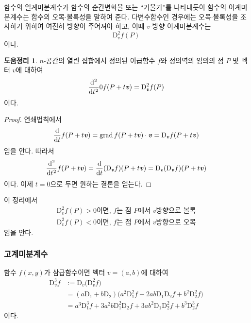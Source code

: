 \documentclass[unfonts,oneside,a4paper]{oblivoir}
\theoremstyle{definition}
\theoremstyle{theorem}
\newtheorem{lemma}{도움정리}[subsubsection]
\renewcommand{\vec}[1]{\bm{\mathit{#1}}}
\newcommand{\dD}{\mathrm{D}}
\DeclareMathOperator{\grad}{grad}
\begin{document}
함수의 일계미분계수가 함수의 순간변화율 또는 ``기울기''를 나타내듯이 함수의 이계미분계수는 함수의 오목$\cdot$볼록성을 말하여 준다.
다변수함수인 경우에는 오목$\cdot$볼록성을 조사하기 위하여 여전히 방향이 주어져야 하고, 이때 $\vec v$-방향 이계미분계수는
\begin{equation*}
    \dD_{\vec v}^2 f(P)
\end{equation*}
이다.

\begin{lemma}
    $n$-공간의 열린 집합에서 정의된 이급함수 $f$와 정의역의 임의의 점 $P$ 및 벡터 $\vec v$에 대하여
    \begin{equation*}
        \diff*[2]{}{t}{0} f(P + t \vec v) = \dD_{\vec v}^2 f(P)
    \end{equation*}
    이다.
\end{lemma}

\begin{proof}
    연쇄법칙에서
    \begin{equation*}
        \diff*{f(P + t \vec v)}{t} = \grad f(P + t \vec v) \cdot \vec v = \dD_{\vec v} f(P + t \vec v)
    \end{equation*}
    임을 안다.
    따라서
    \begin{equation*}
        \diff*[2]{f(P+ t \vec v)}{t} = \diff*{(\dD_{\vec v}f)}{t} (P + t \vec v) = \dD_{\vec v} (\dD_{\vec v}f)(P + t \vec v)
    \end{equation*}
    이다.
    이제 $t = 0$으로 두면 원하는 결론을 얻는다.
\end{proof}

이 정리에서
\begin{align*}
    \dD_{\vec v}^2 f(P) > 0 \text{이면, $f$는 점 $P$에서 $\vec v$방향으로 볼록}\\
    \dD_{\vec v}^2 f(P) < 0 \text{이면, $f$는 점 $P$에서 $\vec v$방향으로 오목}
\end{align*}
임을 안다.

\subsubsection{고계미분계수}
함수 $f(x, y)$가 삼급함수이면 벡터 $\vec v = (a, b)$에 대하여
\begin{align*}
    \dD_{\vec v}^3 f &:= \dD_{\vec v} \bigl(\dD_{\vec v}^2 f\bigr)\\
                     &= (a \dD_1 + b \dD_2) \bigl(a^2 \dD_1^2 f + 2ab \dD_1 \dD_2 f + b^2 \dD_2^2 f\bigr)\\
                     &= a^3 \dD_1^3 f + 3a^2 b \dD_1^2 \dD_2 f + 3ab^2 \dD_1 \dD_2^2 f + b^3 \dD_2^3 f
\end{align*}
이다.
\end{document}
